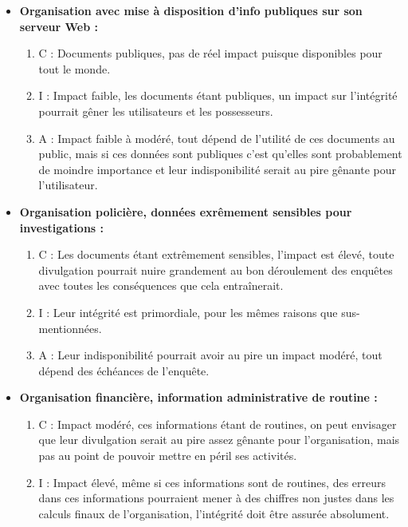 \documentclass{report}
\begin{document}
			\begin{itemize}
				\item \textbf{Organisation avec mise à disposition d'info publiques sur son serveur Web : }\\
					\begin{enumerate}
						\item C : Documents publiques, pas de réel impact puisque disponibles pour tout le monde.
						\item I : Impact faible, les documents étant publiques, un impact sur l'intégrité pourrait gêner les utilisateurs et les possesseurs.\\
						\item A : Impact faible à modéré, tout dépend de l'utilité de ces documents au public, mais si ces données sont publiques c'est qu'elles sont probablement de moindre importance et leur indisponibilité serait au pire gênante pour l'utilisateur.\\
					\end{enumerate}
				\item \textbf{Organisation policière, données exrêmement sensibles pour investigations : }\\
					\begin{enumerate}
						\item C : Les documents étant extrêmement sensibles, l'impact est élevé, toute divulgation pourrait nuire grandement au bon déroulement des enquêtes avec toutes les conséquences que cela entraînerait.\\
						\item I : Leur intégrité est primordiale, pour les mêmes raisons que sus-mentionnées.\\
						\item A : Leur indisponibilité pourrait avoir au pire un impact modéré, tout dépend des échéances de l'enquête.\\
					\end{enumerate}
				\item \textbf{Organisation financière, information administrative de routine : }\\
					\begin{enumerate}
						\item C : Impact modéré, ces informations étant de routines, on peut envisager que leur divulgation serait au pire assez gênante pour l'organisation, mais pas au point de pouvoir mettre en péril ses activités.\\
						\item I : Impact élevé, même si ces informations sont de routines, des erreurs dans ces informations pourraient mener à des chiffres non justes dans les calculs finaux de l'organisation, l'intégrité doit être assurée absolument.\\

\end{enumerate}
\end{itemize}
\end{document}
